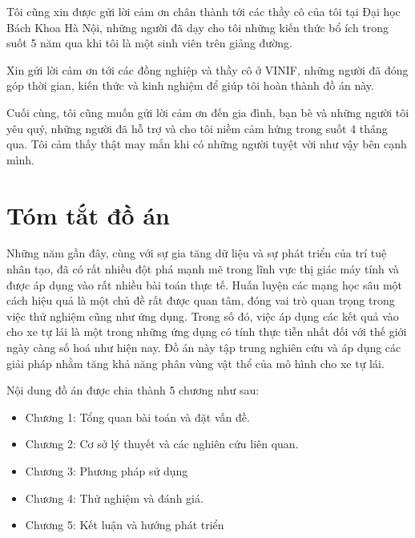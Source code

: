 \documentclass[a4paper, 13pt, oneside]{report}
\begin{document}
Tôi cũng xin được gửi lời cảm ơn chân thành tới các thầy cô của tôi tại Đại học Bách Khoa Hà Nội, những người đã dạy cho tôi những kiến thức bổ ích trong suốt 5 năm qua khi tôi là một sinh viên trên giảng đường.

Xin gửi lời cảm ơn tới các đồng nghiệp và thầy cô ở VINIF, những người đã đóng góp thời gian, kiến thức và kinh nghiệm để giúp tôi hoàn thành đồ án này.

Cuối cùng, tôi cũng muốn gửi lời cảm ơn đến gia đình, bạn bè và những người tôi yêu quý, những người đã hỗ trợ và cho tôi niềm cảm hứng trong suốt 4 tháng qua. Tôi cảm thấy thật may mắn khi có những người tuyệt vời như vậy bên cạnh mình.

\pagebreak

\chapter*{Tóm tắt đồ án}
Những năm gần đây, cùng với sự gia tăng dữ liệu và sự phát triển của trí tuệ nhân tạo, đã có rất nhiều đột phá mạnh mẽ trong lĩnh vực thị giác máy tính và được áp dụng vào rất nhiều bài toán thực tế. Huấn luyện các mạng học sâu một cách hiệu quả là một chủ đề rất được quan tâm, đóng vai trò quan trọng trong việc thử nghiệm cũng như ứng dụng. Trong số đó, việc áp dụng các kết quả vào cho xe tự lái là một trong những ứng dụng có tính thực tiễn nhất đối với thế giới ngày càng số hoá như hiện nay. Đồ án này tập trung nghiên cứu và áp dụng các giải pháp nhằm tăng khả năng phân vùng vật thể của mô hình cho xe tự lái.

Nội dung đồ án được chia thành 5 chương như sau:
\begin{itemize}
    \item Chương 1: Tổng quan bài toán và đặt vấn đề.
    \item Chương 2: Cơ sở lý thuyết và các nghiên cứu liên quan.
    \item Chương 3: Phương pháp sử dụng
    \item Chương 4: Thử nghiệm và đánh giá.
    \item Chương 5: Kết luận và hướng phát triển
\end{itemize}

\pagebreak
{}
\tableofcontents
\pagebreak
{}
\setcounter{page}{1}
\listoffigures
\listoftables

\printglossary[type=\acronymtype,style=long, title=Danh mục từ viết tắt]
\printglossary
\pagebreak
\end{document}
